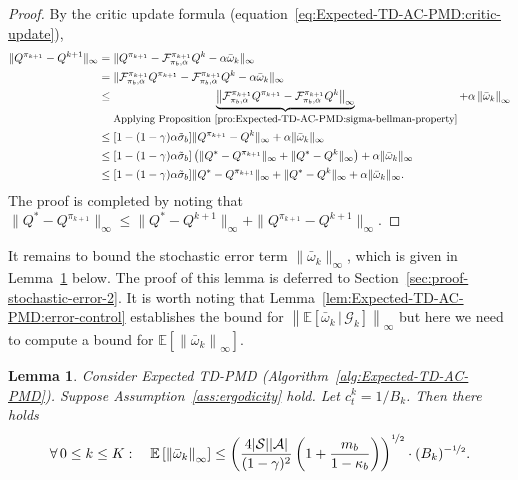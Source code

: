 \documentclass[10pt]{article}
\newcommand{\calA}{\mathcal{A}}
\newcommand{\calS}{\mathcal{S}}
\newcommand{\calF}{\mathcal{F}}
\newcommand{\calG}{\mathcal{G}}
\newcommand{\E}{\mathbb{E}}
\newcommand{\ls}{\left}
\newcommand{\rs}{\right}
\theoremstyle{plain}
\newtheorem{lemma}[theorem]{Lemma}
\theoremstyle{definition}
\begin{document}
\begin{proof}
    By the critic update formula (equation~\eqref{eq:Expected-TD-AC-PMD:critic-update}),
    \begin{align*}
        \| Q^{\pi_{k+1}} - Q^{k+1} \|_\infty &= \| {Q^{\pi_{k+1}}} - \calF^{\pi_{k+1}}_{\pi_b, \alpha}Q^k - \alpha \bar\omega_k \|_\infty \\
        &= \| \calF^{\pi_{k+1}}_{\pi_b, \alpha}{Q^{\pi_{k+1}}} - \calF^{\pi_{k+1}}_{\pi_b, \alpha}Q^k - \alpha \bar\omega_k \|_\infty \\
        &\leq \underbrace{\ls\| \calF^{\pi_{k+1}}_{\pi_b, \alpha} Q^{\pi_{k+1}} - \calF^{\pi_{k+1}}_{\pi_b, \alpha} Q^k \rs\|_\infty}_{\mbox{\small Applying Proposition~\ref{pro:Expected-TD-AC-PMD:sigma-bellman-property}}} + \alpha \ls\| \bar\omega_k \rs\|_\infty \\
        &\leq [1-(1-\gamma)\alpha\tilde\sigma_b] \| Q^{\pi_{k+1}} - Q^k \|_\infty + \alpha \| \bar\omega_k \|_\infty \\
        &\leq [1-(1-\gamma)\alpha\tilde\sigma_b] \ls( \| Q^* - Q^{\pi_{k+1}} \|_\infty + \| Q^* - Q^k \|_\infty \rs) + \alpha \| \bar\omega_k \|_\infty \\
        &\leq [1-(1-\gamma)\alpha\tilde\sigma_b] \| Q^* - Q^{\pi_{k+1}} \|_\infty + \| Q^* - Q^k \|_\infty  + \alpha \| \bar\omega_k \|_\infty.
    \end{align*}
    The proof is completed by noting that $\| Q^* - Q^{\pi_{k+1}} \|_\infty \leq \| Q^* - Q^{k+1} \|_\infty + \| Q^{\pi_{k+1}} - Q^{k+1} \|_\infty$.
\end{proof}

It remains to bound the stochastic error term $\| \bar\omega_k \|_\infty$, which is given in Lemma~\ref{lem:Expected-TD-AC-PMD:error-control-2} below. The proof of this lemma is deferred to Section~\ref{sec:proof-stochastic-error-2}. It is worth noting that  Lemma~\ref{lem:Expected-TD-AC-PMD:error-control} establishes the bound for $\ls\| \E \ls[ \bar\omega_k\, | \, \calG_k \rs]\rs\|_\infty$ but here we need to compute a bound for $\E\ls[ \ls\| \bar\omega_k \rs\|_\infty\rs]$.

\begin{lemma}
    Consider Expected TD-PMD \textup{(}Algorithm~\ref{alg:Expected-TD-AC-PMD}\textup{)}. Suppose Assumption~\ref{ass:ergodicity} hold. Let $c_t^k=1/B_k$. Then there holds
    \begin{align*}
        \forall\, 0 \leq k \leq K: \quad  \E \ls[ \ls\| \bar\omega_k \rs\|_\infty \rs] \leq \ls( \frac{4|\calS||\calA|}{(1-\gamma)^2} \ls( 1+\frac{m_b}{1-\kappa_b} \rs) \rs)^{\nicefrac{1}{2}} \cdot (B_k)^{-\nicefrac{1}{2}}.
    \end{align*}
    \label{lem:Expected-TD-AC-PMD:error-control-2}
\end{lemma}
\end{document}
